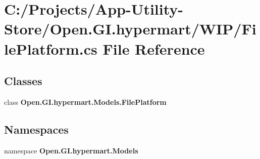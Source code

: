 \section{C\+:/\+Projects/\+App-\/\+Utility-\/\+Store/\+Open.G\+I.\+hypermart/\+W\+I\+P/\+File\+Platform.cs File Reference}
\label{_file_platform_8cs}
\subsection*{Classes}
\begin{DoxyCompactItemize}
\item 
class \textbf{ Open.\+G\+I.\+hypermart.\+Models.\+File\+Platform}
\end{DoxyCompactItemize}
\subsection*{Namespaces}
\begin{DoxyCompactItemize}
\item 
namespace \textbf{ Open.\+G\+I.\+hypermart.\+Models}
\end{DoxyCompactItemize}
